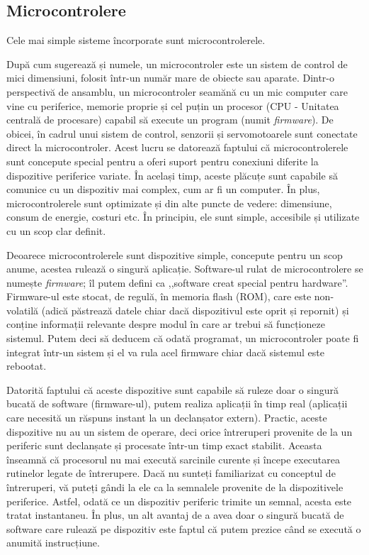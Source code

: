 \subsection{Microcontrolere}
\label{sec:embed:micro-comp:micro}

Cele mai simple sisteme încorporate sunt microcontrolerele.

După cum sugerează și numele, un microcontroler este un sistem de control de mici dimensiuni, folosit într-un număr mare de obiecte sau aparate.
Dintr-o perspectivă de ansamblu, un microcontroler seamănă cu un mic computer care vine cu periferice, memorie proprie și cel puțin un procesor (CPU - Unitatea centrală de procesare) capabil să execute un program (numit \textit{firmware}).
De obicei, în cadrul unui sistem de control, senzorii și servomotoarele sunt conectate direct la microcontroler.
Acest lucru se datorează faptului că microcontrolerele sunt concepute special pentru a oferi suport pentru conexiuni diferite la dispozitive periferice variate.
În același timp, aceste plăcuțe sunt capabile să comunice cu un dispozitiv mai complex, cum ar fi un computer.
În plus, microcontrolerele sunt optimizate și din alte puncte de vedere: dimensiune, consum de energie, costuri etc.
În principiu, ele sunt simple, accesibile și utilizate cu un scop clar definit.

Deoarece microcontrolerele sunt dispozitive simple, concepute pentru un scop anume, acestea rulează o singură aplicație.
Software-ul rulat de microcontrolere se numește \textit{firmware};
îl putem defini ca ,,software creat special pentru hardware''.
Firmware-ul este stocat, de regulă, în memoria flash (ROM), care este non-volatilă (adică păstrează datele chiar dacă dispozitivul este oprit și repornit) și conține informații relevante despre modul în care ar trebui să funcționeze sistemul.
Putem deci să deducem că odată programat, un microcontroler poate fi integrat într-un sistem și el va rula acel firmware chiar dacă sistemul este rebootat.

Datorită faptului că aceste dispozitive sunt capabile să ruleze doar o singură bucată de software (firmware-ul), putem realiza aplicații în timp real (aplicații care necesită un răspuns instant la un declanșator extern).
Practic, aceste dispozitive nu au un sistem de operare, deci orice întreruperi provenite de la un periferic sunt declanșate și procesate într-un timp exact stabilit.
Aceasta înseamnă că procesorul nu mai execută sarcinile curente și începe executarea rutinelor legate de întrerupere.
Dacă nu sunteți familiarizat cu conceptul de întreruperi, vă puteți gândi la ele ca la semnalele provenite de la dispozitivele periferice.
Astfel, odată ce un dispozitiv periferic trimite un semnal, acesta este tratat instantaneu.
În plus, un alt avantaj de a avea doar o singură bucată de software care rulează pe dispozitiv este faptul că putem prezice când se execută o anumită instrucțiune.

